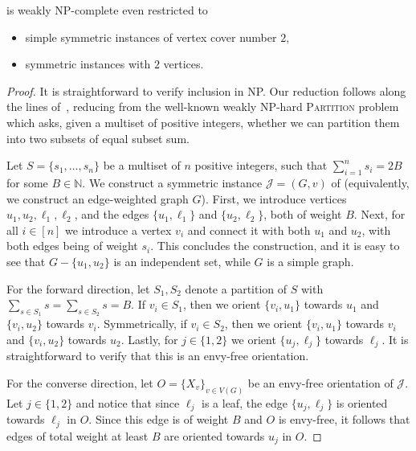 \documentclass[11pt,letterpaper]{article}
\begin{document}
\begin{theoremrep}[\appsymb]\label{thm:ef:weak_np_hardness}
    {\EFo} is weakly NP-complete even restricted to
    \begin{itemize}
        \item simple symmetric instances of vertex cover number $2$,
        \item symmetric instances with $2$ vertices.
    \end{itemize}
\end{theoremrep}

\begin{proof}
    It is straightforward to verify inclusion in NP.
    Our reduction follows along the lines of~\cite[Theorem 3]{ijcai/DeligkasEGK25},
    reducing from the well-known weakly NP-hard \textsc{Partition} problem which asks,
    given a multiset of positive integers, whether we can partition them into two subsets of equal subset sum.

    Let $S = \{ s_1, \ldots, s_n \}$ be a multiset of $n$ positive integers,
    such that $\sum_{i=1}^n s_i = 2B$ for some $B \in \mathbb{N}$.
    We construct a symmetric instance $\mathcal{J} = (G,v)$ of {\EFo} (equivalently,
    we construct an edge-weighted graph $G$).
    First, we introduce vertices $u_1, u_2, \ell_1, \ell_2$, and the edges $\{ u_1, \ell_1 \}$ and $\{ u_2 , \ell_2 \}$, both of weight $B$.
    Next, for all $i \in [n]$ we introduce a vertex $v_i$ and connect it with both $u_1$ and $u_2$, with both edges being of weight $s_i$.
    This concludes the construction, and it is easy to see that $G - \{u_1,u_2\}$ is an independent set, while $G$ is a simple graph.

    For the forward direction, let $S_1, S_2$ denote a partition of $S$ with $\sum_{s \in S_1} s = \sum_{s \in S_2} s = B$.
    If $v_i \in S_1$, then we orient $\{ v_i, u_1 \}$ towards $u_1$ and $\{ v_i , u_2 \}$ towards $v_i$.
    Symmetrically, if $v_i \in S_2$, then we orient $\{ v_i, u_1 \}$ towards $v_i$ and $\{ v_i , u_2 \}$ towards $u_2$.
    Lastly, for $j \in \{1,2\}$ we orient $\{ u_j, \ell_j \}$ towards $\ell_j$.
    It is straightforward to verify that this is an envy-free orientation.

    For the converse direction, let $O = \{X_v\}_{v \in V(G)}$ be an envy-free orientation of $\mathcal{J}$.
    Let $j \in \{1,2\}$ and notice that since $\ell_j$ is a leaf, the edge $\{u_j,\ell_j\}$ is oriented towards $\ell_j$ in $O$.
    Since this edge is of weight $B$ and $O$ is envy-free, it follows that edges of total weight at least $B$ are oriented towards $u_j$ in $O$.


\end{proof}
\end{document}
